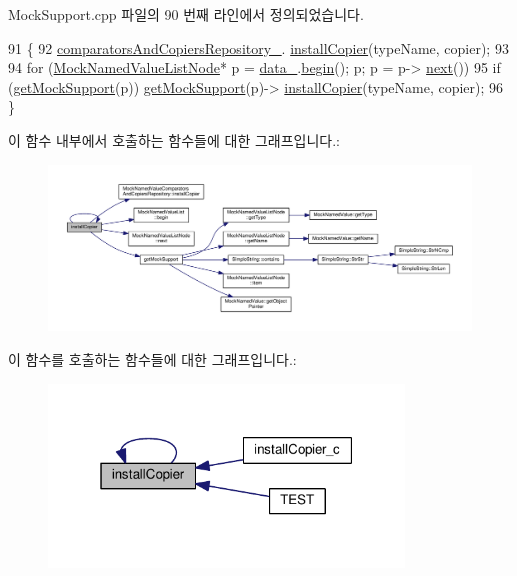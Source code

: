 Mock\+Support.\+cpp 파일의 90 번째 라인에서 정의되었습니다.


\begin{DoxyCode}
91 \{
92     \hyperlink{class_mock_support_a372117e733b5aa30e4badf791416fd5f}{comparatorsAndCopiersRepository\_}.
      \hyperlink{class_mock_named_value_comparators_and_copiers_repository_a558aef2ec4dc86ff685a8e3cf9e86441}{installCopier}(typeName, copier);
93 
94     \textcolor{keywordflow}{for} (\hyperlink{class_mock_named_value_list_node}{MockNamedValueListNode}* p = \hyperlink{class_mock_support_a26b06d2d43a7804c9aa5808409c0c1ee}{data\_}.\hyperlink{class_mock_named_value_list_a4a5976d05542385eb64ea73eee7fc59c}{begin}(); p; p = p->
      \hyperlink{class_mock_named_value_list_node_adaf0ca3232d35f7efae1bade86b8027e}{next}())
95         \textcolor{keywordflow}{if} (\hyperlink{class_mock_support_a575951d416e49f54fd1a3fc4823609e3}{getMockSupport}(p)) \hyperlink{class_mock_support_a575951d416e49f54fd1a3fc4823609e3}{getMockSupport}(p)->
      \hyperlink{class_mock_support_a989b3e03deb9ce609bed0dbec3128105}{installCopier}(typeName, copier);
96 \}
\end{DoxyCode}


이 함수 내부에서 호출하는 함수들에 대한 그래프입니다.\+:
\nopagebreak
\begin{figure}[H]
\begin{center}
\leavevmode
\includegraphics[width=350pt]{class_mock_support_a989b3e03deb9ce609bed0dbec3128105_cgraph}
\end{center}
\end{figure}




이 함수를 호출하는 함수들에 대한 그래프입니다.\+:
\nopagebreak
\begin{figure}[H]
\begin{center}
\leavevmode
\includegraphics[width=268pt]{class_mock_support_a989b3e03deb9ce609bed0dbec3128105_icgraph}
\end{center}
\end{figure}


